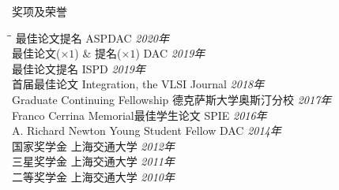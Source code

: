 
\begin{rSection}{奖项及荣誉}
\begin{tabbing}
\hspace{3.3in}\= \hspace{3.1in}\= \kill
最佳论文提名 \> ASPDAC \> {\em 2020年 } \\
最佳论文($\times 1$) \& 提名($\times 1$) \> DAC \> {\em 2019年 } \\
最佳论文提名 \> ISPD \> {\em 2019年 } \\
首届最佳论文 \> Integration, the VLSI Journal \> {\em 2018年 } \\
Graduate Continuing Fellowship \> 德克萨斯大学奥斯汀分校 \> {\em 2017年 } \\
Franco Cerrina Memorial最佳学生论文 \> SPIE \> {\em 2016年 } \\
A. Richard Newton Young Student Fellow \> DAC \> {\em 2014年 } \\
国家奖学金 \> 上海交通大学 \> {\em 2012年 } \\
三星奖学金 \> 上海交通大学 \> {\em 2011年 } \\
二等奖学金 \> 上海交通大学 \> {\em 2010年 }
\end{tabbing}
\end{rSection}

